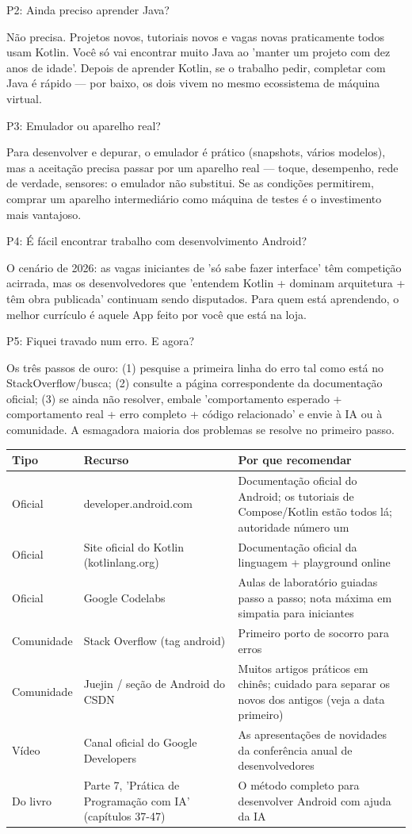 P2: Ainda preciso aprender Java?

Não precisa. Projetos novos, tutoriais novos e vagas novas praticamente todos usam Kotlin. Você só vai encontrar muito Java ao 'manter um projeto com dez anos de idade'. Depois de aprender Kotlin, se o trabalho pedir, completar com Java é rápido — por baixo, os dois vivem no mesmo ecossistema de máquina virtual.

P3: Emulador ou aparelho real?

Para desenvolver e depurar, o emulador é prático (snapshots, vários modelos), mas a aceitação precisa passar por um aparelho real — toque, desempenho, rede de verdade, sensores: o emulador não substitui. Se as condições permitirem, comprar um aparelho intermediário como máquina de testes é o investimento mais vantajoso.

P4: É fácil encontrar trabalho com desenvolvimento Android?

O cenário de 2026: as vagas iniciantes de 'só sabe fazer interface' têm competição acirrada, mas os desenvolvedores que 'entendem Kotlin + dominam arquitetura + têm obra publicada' continuam sendo disputados. Para quem está aprendendo, o melhor currículo é aquele App feito por você que está na loja.

P5: Fiquei travado num erro. E agora?

Os três passos de ouro: (1) pesquise a primeira linha do erro tal como está no StackOverflow/busca; (2) consulte a página correspondente da documentação oficial; (3) se ainda não resolver, embale 'comportamento esperado + comportamento real + erro completo + código relacionado' e envie à IA ou à comunidade. A esmagadora maioria dos problemas se resolve no primeiro passo.


\begin{center}
\begin{tabularx}{\linewidth}{|X|X|X|}
\hline
\textbf{Tipo} & \textbf{Recurso} & \textbf{Por que recomendar} \tabularnewline
\hline
Oficial & developer.android.com & Documentação oficial do Android; os tutoriais de Compose/Kotlin estão todos lá; autoridade número um \tabularnewline
Oficial & Site oficial do Kotlin (kotlinlang.org) & Documentação oficial da linguagem + playground online \tabularnewline
Oficial & Google Codelabs & Aulas de laboratório guiadas passo a passo; nota máxima em simpatia para iniciantes \tabularnewline
Comunidade & Stack Overflow (tag android) & Primeiro porto de socorro para erros \tabularnewline
Comunidade & Juejin / seção de Android do CSDN & Muitos artigos práticos em chinês; cuidado para separar os novos dos antigos (veja a data primeiro) \tabularnewline
Vídeo & Canal oficial do Google Developers & As apresentações de novidades da conferência anual de desenvolvedores \tabularnewline
Do livro & Parte 7, 'Prática de Programação com IA' (capítulos 37-47) & O método completo para desenvolver Android com ajuda da IA \tabularnewline
\hline
\end{tabularx}
\end{center}

